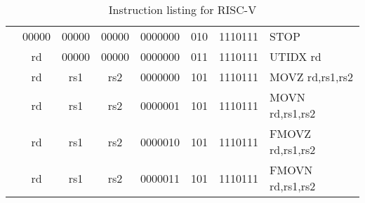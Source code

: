 \begin{table}[p]
\begin{small}
\begin{center}
\begin{tabular}{rccccccccccl}
&
\multicolumn{1}{|c|}{00000} &
\multicolumn{1}{c|}{00000} &
\multicolumn{1}{c|}{00000} &
\multicolumn{4}{c|}{0000000} &
\multicolumn{2}{c|}{010} &
\multicolumn{1}{c|}{1110111} & STOP  \\
\cline{2-11}
  

&
\multicolumn{1}{|c|}{rd} &
\multicolumn{1}{c|}{00000} &
\multicolumn{1}{c|}{00000} &
\multicolumn{4}{c|}{0000000} &
\multicolumn{2}{c|}{011} &
\multicolumn{1}{c|}{1110111} & UTIDX rd \\
\cline{2-11}
  

&
\multicolumn{1}{|c|}{rd} &
\multicolumn{1}{c|}{rs1} &
\multicolumn{1}{c|}{rs2} &
\multicolumn{4}{c|}{0000000} &
\multicolumn{2}{c|}{101} &
\multicolumn{1}{c|}{1110111} & MOVZ rd,rs1,rs2 \\
\cline{2-11}
  

&
\multicolumn{1}{|c|}{rd} &
\multicolumn{1}{c|}{rs1} &
\multicolumn{1}{c|}{rs2} &
\multicolumn{4}{c|}{0000001} &
\multicolumn{2}{c|}{101} &
\multicolumn{1}{c|}{1110111} & MOVN rd,rs1,rs2 \\
\cline{2-11}
  

&
\multicolumn{1}{|c|}{rd} &
\multicolumn{1}{c|}{rs1} &
\multicolumn{1}{c|}{rs2} &
\multicolumn{4}{c|}{0000010} &
\multicolumn{2}{c|}{101} &
\multicolumn{1}{c|}{1110111} & FMOVZ rd,rs1,rs2 \\
\cline{2-11}
  

&
\multicolumn{1}{|c|}{rd} &
\multicolumn{1}{c|}{rs1} &
\multicolumn{1}{c|}{rs2} &
\multicolumn{4}{c|}{0000011} &
\multicolumn{2}{c|}{101} &
\multicolumn{1}{c|}{1110111} & FMOVN rd,rs1,rs2 \\
\cline{2-11}
  

\end{tabular}
\end{center}
\end{small}
\caption{Instruction listing for RISC-V}
\label{instr-table}
\end{table}
  
